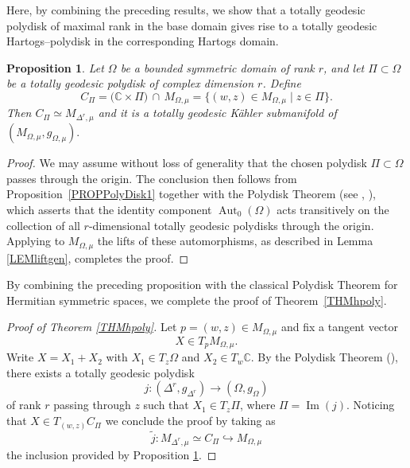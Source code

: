 \documentclass[reqno, 11pt]{amsart}
\newtheorem{prop}[theor]{Proposition}
\newcommand{\C}{\mathbb{C}}
\newcommand{\Aut}{\operatorname {Aut}}
\begin{document}
Here, by combining the preceding results, we show that a totally geodesic polydisk of maximal rank in the base domain gives rise to a totally geodesic Hartogs–polydisk in the corresponding Hartogs domain.
\begin{prop}\label{PROPPolyDisk2}
Let $\Omega$ be a bounded symmetric domain of  rank $r$, and let 
$\Pi\subset\Omega$
be a totally geodesic polydisk of complex dimension $r$.  Define
\[
C_{\Pi}
=\bigl(\C\times\Pi\bigr)\,\cap\,M_{\Omega,\mu}
=\{(w, z)\in M_{\Omega,\mu}\mid z\in\Pi\}.
\]
Then $C_{\Pi}\simeq M_{\Delta^r, \mu}$ and it  is a totally geodesic Kähler submanifold of $(M_{\Omega,\mu}, g_{{\Omega,\mu}}).$ 
\end{prop}

\begin{proof}
We may assume without loss of generality that the chosen polydisk $\Pi\subset\Omega$ passes through the origin.  The conclusion then follows from Proposition~\ref{PROPPolyDisk1} together with the Polydisk Theorem (see \cite{WolfBook1969FineStructureHSSpolydisc},  \cite[Thm.~VI.3.5]{ROOSinFarautKoranyiRoosBook2000}), which asserts that the identity component $\Aut_0(\Omega)$ acts transitively on the collection of all $r$-dimensional totally geodesic polydisks through the origin.  Applying to $M_{\Omega,\mu}$ the lifts of these automorphisms, as described in Lemma \ref{LEMliftgen}, completes the proof.
\end{proof}

By combining the preceding proposition with the classical Polydisk Theorem for Hermitian symmetric spaces, we complete the proof of Theorem~\ref{THMhpoly}.

\begin{proof}[Proof of Theorem \ref{THMhpoly}]
Let $p=(w, z)\in M_{\Omega,\mu}$ and fix a tangent vector
$$
X\in T_{p}M_{\Omega,\mu}.
$$
Write $X = X_1 + X_2$ with $X_1\in T_z\Omega$ and $X_2\in T_w\C$.  By the Polydisk Theorem (\cite{WolfBook1969FineStructureHSSpolydisc}), there exists a totally geodesic polydisk
$$
j\colon (\Delta^r, g_{\Delta^r}) \rightarrow (\Omega, g_{\Omega})
$$
of rank $r$ passing through $z$ such that $X_1\in T_z\Pi$, where $\Pi = \operatorname{Im}(j)$.  
Noticing that
$X\in T_{(w,z)}C_{\Pi}$
we conclude the proof by taking as 
$$\widetilde{j}:M_{\Delta^r, \mu}\simeq C_{\Pi}\hookrightarrow M_{\Omega,\mu}$$
the inclusion provided by Proposition \ref{PROPPolyDisk2}. 
\end{proof}



\end{document}
